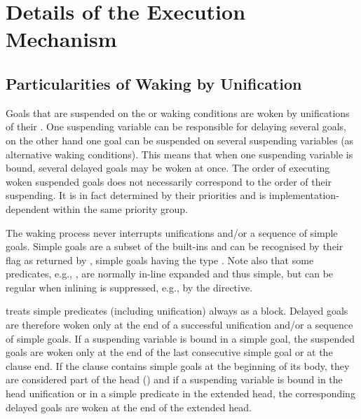 {%
\section{Details of the Execution Mechanism}

\subsection{Particularities of Waking by Unification}
Goals that are suspended on the  or  waking
conditions are woken by unifications of their
.
One suspending variable can be responsible for delaying several goals,
on the other hand one goal can be suspended on several
suspending variables (as alternative waking conditions).
This means that when one suspending variable is bound,
several delayed goals may be woken at once.
The order of executing woken suspended goals does not necessarily correspond
to the order of their suspending. It is in fact determined by their
priorities and is implementation-dependent within the same priority group.

The waking process never interrupts unifications and/or a sequence
of simple goals.
Simple goals are a subset of the built-ins and
can be recognised by their 
flag as returned by
,
simple goals having the type .
Note also that some predicates, e.g.,
,
are normally in-line expanded and thus simple, but can be regular when
inlining is suppressed, e.g., by the  directive.

{\eclipse} treats simple predicates (including unification) always as a block.
Delayed goals are therefore woken only at the end of a successful
unification and/or a sequence of simple goals.
If a suspending variable is bound in a simple goal, the suspended
goals are woken only at the end of the last consecutive simple
goal or at the clause end.
If the clause contains simple goals at the beginning of its
body, they are considered part of the head ()
and if a suspending variable is bound in the head unification or
in a simple predicate in the extended head, the corresponding
delayed goals are woken at the end of the extended head.

}
